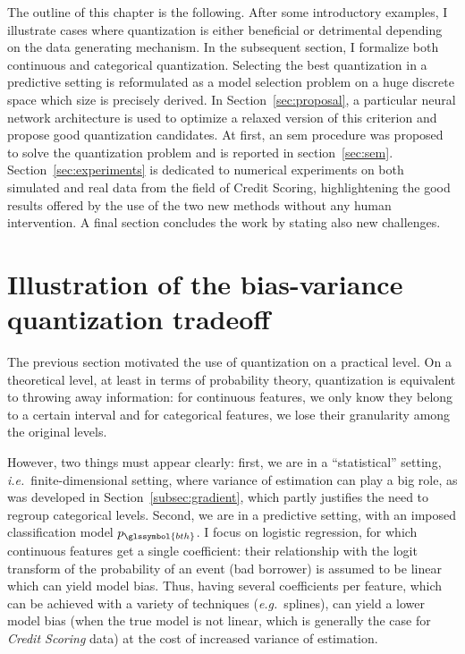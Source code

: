 The outline of this chapter is the following. After some introductory examples, I illustrate cases where quantization is either beneficial or detrimental depending on the data generating mechanism. In the subsequent section, I formalize both continuous and categorical quantization. Selecting the best quantization in a predictive setting is reformulated as a model selection problem on a huge discrete space which size is precisely derived. In Section~\ref{sec:proposal}, a particular neural network architecture is used to optimize a relaxed version of this criterion and propose good quantization candidates. At first, an \gls{sem} procedure was proposed to solve the quantization problem and is reported in section~\ref{sec:sem}. Section~\ref{sec:experiments} is dedicated to numerical experiments on both simulated and real data from the field of Credit Scoring, highlightening the good results offered by the use of the two new methods without any human intervention. A final section concludes the work by stating also new challenges.


\section{Illustration of the bias-variance quantization tradeoff}
 

The previous section motivated the use of quantization on a practical level. On a theoretical level, at least in terms of probability theory, quantization is equivalent to throwing away information: for continuous features, we only know they belong to a certain interval and for categorical features, we lose their granularity among the original levels.

However, two things must appear clearly: first, we are in a ``statistical'' setting, \textit{i.e.}\ finite-dimensional setting, where variance of estimation can play a big role, as was developed in Section~\ref{subsec:gradient}, which partly justifies the need to regroup categorical levels. Second, we are in a predictive setting, with an imposed classification model $p_{\glssymbol{bth}}$. I focus on logistic regression, for which continuous features get a single coefficient: their relationship with the logit transform of the probability of an event (bad borrower) is assumed to be linear which can yield model bias. Thus, having several coefficients per feature, which can be achieved with a  variety of techniques (\textit{e.g.}\ splines), can yield a lower model bias (when the true model is not linear, which is generally the case for \textit{Credit Scoring} data) at the cost of increased variance of estimation.

